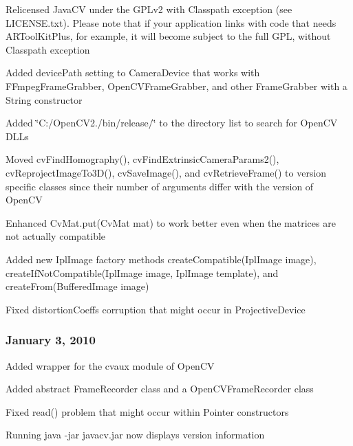\begin{DoxyItemize}
\item Relicensed Java\+C\+V under the G\+P\+Lv2 with Classpath exception (see L\+I\+C\+E\+N\+S\+E.\+txt). Please note that if your application links with code that needs A\+R\+Tool\+Kit\+Plus, for example, it will become subject to the full G\+P\+L, without Classpath exception
\item Added {\ttfamily device\+Path} setting to {\ttfamily Camera\+Device} that works with {\ttfamily F\+Fmpeg\+Frame\+Grabber}, {\ttfamily Open\+C\+V\+Frame\+Grabber}, and other {\ttfamily Frame\+Grabber} with a String constructor
\item Added \char`\"{}\+C\+:/\+Open\+C\+V2./bin/release/\char`\"{} to the directory list to search for Open\+C\+V D\+L\+Ls
\item Moved {\ttfamily cv\+Find\+Homography()}, {\ttfamily cv\+Find\+Extrinsic\+Camera\+Params2()}, {\ttfamily cv\+Reproject\+Image\+To3\+D()}, {\ttfamily cv\+Save\+Image()}, and {\ttfamily cv\+Retrieve\+Frame()} to version specific classes since their number of arguments differ with the version of Open\+C\+V
\item Enhanced {\ttfamily Cv\+Mat.\+put(\+Cv\+Mat mat)} to work better even when the matrices are not actually compatible
\item Added new {\ttfamily Ipl\+Image} factory methods {\ttfamily create\+Compatible(\+Ipl\+Image image)}, {\ttfamily create\+If\+Not\+Compatible(\+Ipl\+Image image, Ipl\+Image template)}, and {\ttfamily create\+From(\+Buffered\+Image image)}
\item Fixed {\ttfamily distortion\+Coeffs} corruption that might occur in {\ttfamily Projective\+Device}
\end{DoxyItemize}

\subsubsection*{January 3, 2010}


\begin{DoxyItemize}
\item Added wrapper for the {\ttfamily cvaux} module of Open\+C\+V
\item Added abstract {\ttfamily Frame\+Recorder} class and a {\ttfamily Open\+C\+V\+Frame\+Recorder} class
\item Fixed read() problem that might occur within Pointer constructors
\item Running {\ttfamily java -\/jar javacv.\+jar} now displays version information
\end{DoxyItemize}

